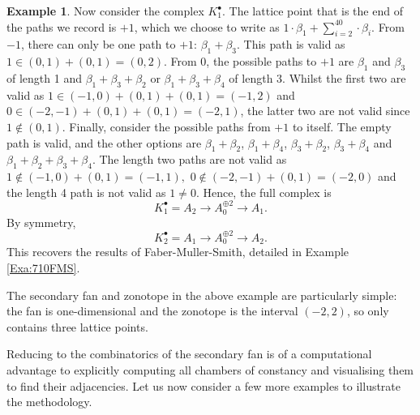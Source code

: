 \documentclass[reqno, 12pt]{amsart}
\theoremstyle{definition}
\newtheorem{example}[theorem]{Example}
\numberwithin{equation}{section}
\begin{document}
\begin{example}
Now consider the complex $K_{1}^\bullet$. The lattice point that is the end of the paths we record is $+1$, which we choose to write as $1\cdot\beta_1+\sum_{i=2}^40\cdot\beta_i$. From $-1$, there can only be one path to $+1$: $\beta_1+\beta_3$. This path is valid as $1\in (0,1)+(0,1)=(0,2)$. From $0$, the possible paths to $+1$ are $\beta_1$ and $\beta_3$ of length 1 and $\beta_1+\beta_3+\beta_2$ or $\beta_1+\beta_3+\beta_4$ of length 3. Whilst the first two are valid as $1\in (-1,0)+(0,1)+(0,1)=(-1,2)$ and $0\in(-2,-1)+(0,1)+(0,1)=(-2,1)$, the latter two are not valid since $1\not\in (0,1)$. Finally, consider the possible paths from $+1$ to itself. The empty path is valid, and the other options are $\beta_1+\beta_2$, $\beta_1+\beta_4$, $\beta_3+\beta_2$, $\beta_3+\beta_4$ and $\beta_1+\beta_2+\beta_3+\beta_4$. The length two paths are not valid as $1\not\in (-1,0)+(0,1)=(-1,1),$ $0\not\in (-2,-1)+(0,1)=(-2,0)$ and the length 4 path is not valid as $1\neq 0$. Hence, the full complex is\[
K_{1}^\bullet=A_{2}\rightarrow A_0^{\oplus 2}\rightarrow A_{1}.
\]
By symmetry, \[
K_{2}^\bullet=A_{1}\rightarrow A_0^{\oplus 2}\rightarrow A_2.
\]
This recovers the results of Faber-Muller-Smith, detailed in Example \ref{Exa:710FMS}.
\end{example}

The secondary fan and zonotope in the above example are particularly simple: the fan is one-dimensional and the zonotope is the interval $(-2,2)$, so only contains three lattice points.

Reducing to the combinatorics of the secondary fan is of a computational advantage to explicitly computing all chambers of constancy and visualising them to find their adjacencies. Let us now consider a few more examples to illustrate the methodology.
\end{document}
